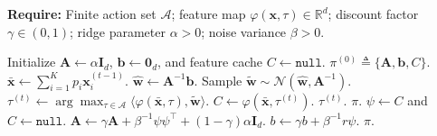 \begin{algorithm}[t]
\caption{(Contextual case; round-wise) Discounted LinTS}
\label{alg:dlints_round}
\textbf{Require:} Finite action set $\mathcal A$; feature map $\varphi(\boldsymbol{x},\tau)\in\mathbb R^d$; discount factor $\gamma\in(0,1)$; ridge parameter $\alpha>0$; noise variance $\beta>0$.
\begin{algorithmic}[1]
    \State Initialize $\boldsymbol{A}\gets \alpha \boldsymbol{I}_d$, $\boldsymbol{b}\gets \boldsymbol{0}_d$, and feature cache $C\gets \texttt{null}$.
    \State \Return $\pi^{(0)} \triangleq \{\boldsymbol{A},\boldsymbol{b},C\}$.
\EndProcedure
{}
    \State $\bar{\boldsymbol{x}} \gets \sum_{i=1}^K p_i \boldsymbol{x}_i^{(t-1)}$.
    \State $\hat{\boldsymbol{w}} \gets \boldsymbol{A}^{-1}\boldsymbol{b}$.
    \State Sample $\tilde{\boldsymbol{w}} \sim \mathcal N(\hat{\boldsymbol{w}}, \boldsymbol{A}^{-1})$.
    \State $\tau^{(t)} \gets \arg\max_{\tau\in\mathcal A}\langle \varphi(\bar{\boldsymbol{x}},\tau),\tilde{\boldsymbol{w}}\rangle$.
    \State $C \gets \varphi(\bar{\boldsymbol{x}},\tau^{(t)})$.
    \State \Return $\tau^{(t)}$.
\EndProcedure
{}
     \State \Return $\pi$. \EndIf
    \State $\psi \gets C$ and $C\gets \texttt{null}$.
    \State $\boldsymbol{A} \gets \gamma \boldsymbol{A} + \beta^{-1}\psi\psi^\top + (1-\gamma)\alpha \boldsymbol{I}_d$.
    \State $b \gets \gamma b + \beta^{-1}r\psi$.
    \State \Return $\pi$.
\EndProcedure
\end{algorithmic}
\end{algorithm}